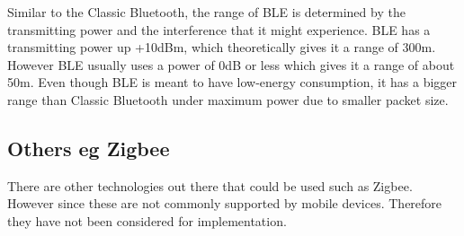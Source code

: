 Similar to the Classic Bluetooth, the range of BLE is determined by
the transmitting power and the interference that it might experience.
BLE has a transmitting power up +10dBm, which theoretically gives it a range of
300m\cite{bluetooth-chalmers}. However BLE usually uses a power of 0dB or less
which gives it a range of about 50m. Even though BLE is meant to have
low-energy consumption, it has a bigger range than Classic Bluetooth
under maximum power due to smaller packet size. 


\subsection{Others eg Zigbee}

There are other technologies out there that could be used such
as Zigbee\cite{zigbee}. However since these are not commonly supported by mobile
devices. Therefore they have not been considered for implementation.




